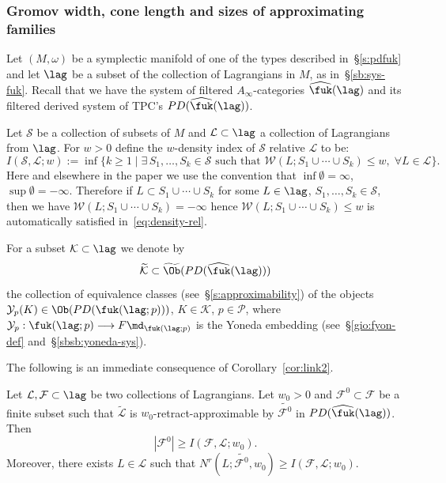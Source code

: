 


\subsubsection{Gromov width, cone length and sizes of approximating
  families} \label{sbsb:gwidth-2}

Let $(M, \omega)$ be a symplectic manifold of one of the types
described in~\S\ref{s:pdfuk} and let $\lag$ be a subset of the
collection of Lagrangians in $M$, as in~\S\ref{sb:sys-fuk}. Recall
that we have the system of filtered $A_{\infty}$-categories
$\widehat{\fuk}(\lag)$ and its filtered derived system of TPC's
$PD(\widehat{\fuk}(\lag))$.

Let $\mathcal{S}$ be a collection of subsets of $M$ and
$\mathcal{L} \subset \lag$ a collection of Lagrangians from
$\lag$. For $w > 0$ define the $w$-density index of $\mathcal{S}$
relative $\mathcal{L}$ to be:
\begin{equation} \label{eq:density-rel} I(\mathcal{S}, \mathcal{L}; w)
  := \inf \bigl\{k \geq 1 \mid \exists \, S_1, \ldots, S_k \in
  \mathcal{S} \text{ such that } \mathscr{W}(L; S_1 \cup \cdots \cup
  S_k) \leq w, \; \forall L \in \mathcal{L} \bigr\}.
\end{equation}
Here and elsewhere in the paper we use the convention that
$\inf \emptyset = \infty$, $\sup \emptyset = -\infty$. Therefore if
$L \subset S_1 \cup \cdots \cup S_k$ for some $L \in \lag$,
$S_1, \ldots, S_k \in \mathcal{S}$, then we have
$\mathscr{W}(L; S_1 \cup \cdots \cup S_k) = -\infty$ hence
$\mathscr{W}(L; S_1 \cup \cdots \cup S_k) \leq w$ is automatically
satisfied in~\eqref{eq:density-rel}.

For a subset $\mathcal{K} \subset \lag$ we denote by
$$\widetilde{\mathcal{K}} \subset
\widetilde{\Ob}(PD(\widehat{\fuk}(\lag)))$$ the collection of
equivalence classes (see~\S\ref{s:approximability}) of the objects
$\mathcal{Y}_p(K) \in \Ob(PD(\fuk(\lag; p)))$, $K \in \mathcal{K}$,
$p \in \mathcal{P}$, where
$\mathcal{Y}_p: \fuk(\lag; p) \longrightarrow F\md_{\fuk(\lag; p)}$ is
the Yoneda embedding (see~\S\ref{gio:fyon-def}
and~\S\ref{sbsb:yoneda-sys}).

The following is an immediate consequence of
Corollary~\ref{cor:link2}.
\begin{cor} \label{c:approx-index} Let
  $\mathcal{L}, \mathcal{F} \subset \lag$ be two collections of
  Lagrangians. Let $w_0 > 0$ and $\mathcal{F}^0 \subset \mathcal{F}$
  be a finite subset such that $\widetilde{\mathcal{L}}$ is
  $w_0$-retract-approximable by $\widetilde{\mathcal{F}^0}$ in
  $PD(\widehat{\fuk}(\lag))$. Then
  \begin{equation} \label{eq:size-index} |\mathcal{F}^0| \geq
    I(\mathcal{F}, \mathcal{L}; w_0).
  \end{equation}
  Moreover, there exists $L \in \mathcal{L}$ such that
  $N^r(L; \widetilde{\mathcal{F}^0}, w_0) \geq I(\mathcal{F},
  \mathcal{L}; w_0)$.
\end{cor}

